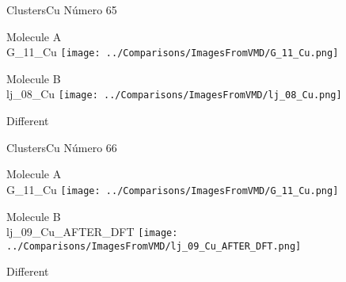  \newpage

\vtab[-3cm]
\begin{center}
{\large ClustersCu \tab Número 65}
\end{center}
\begin{multicols}{2}
\begin{center}
Molecule A \\ 
G\_11\_Cu
\texttt{[image: ../Comparisons/ImagesFromVMD/G\_11\_Cu.png]}
\\
\vtab

\columnbreak
Molecule B \\ 
lj\_08\_Cu
\texttt{[image: ../Comparisons/ImagesFromVMD/lj\_08\_Cu.png]}
\\
\vtab


\end{center}
\end{multicols}
\begin{center}
\textcolor{NavyBlue}{\Large Different}
\end{center}

 \newpage

\vtab[-3cm]
\begin{center}
{\large ClustersCu \tab Número 66}
\end{center}
\begin{multicols}{2}
\begin{center}
Molecule A \\ 
G\_11\_Cu
\texttt{[image: ../Comparisons/ImagesFromVMD/G\_11\_Cu.png]}
\\
\vtab

\columnbreak
Molecule B \\ 
lj\_09\_Cu\_AFTER\_DFT
\texttt{[image: ../Comparisons/ImagesFromVMD/lj\_09\_Cu\_AFTER\_DFT.png]}
\\
\vtab


\end{center}
\end{multicols}
\begin{center}
\textcolor{NavyBlue}{\Large Different}
\end{center}

 \newpage


